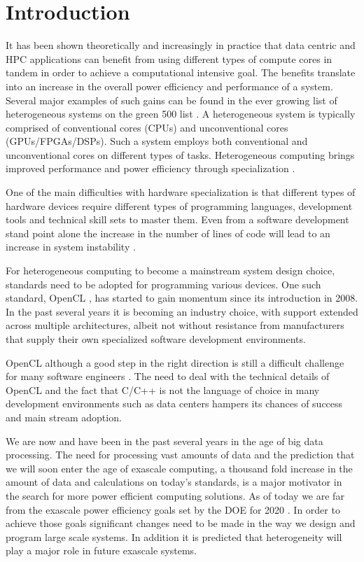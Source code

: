 \documentclass[runningheads,a4paper]{llncs}
\begin{document}
\section{Introduction}

It has been shown theoretically \cite{Chung:2010} and increasingly in practice that data centric \cite{Chalamalasetti:2012} and HPC \cite{Gan:2013} applications can benefit from using different types of compute cores in tandem in order to achieve a computational intensive goal. The benefits translate into an increase in the overall power efficiency and performance of a system. Several major examples of such gains can be found in the ever growing list of heterogeneous systems on the green 500 list \cite{green500:2014}. A heterogeneous system is typically comprised of conventional cores (CPUs) and unconventional cores (GPUs/FPGAs/DSPs). Such a system employs both conventional and unconventional cores on different types of tasks. Heterogeneous computing brings improved performance and power efficiency through specialization \cite{Huang:2009}.

One of the main difficulties with hardware specialization is that different types of hardware devices require different types of programming languages, development tools and technical skill sets to master them. Even from a software development stand point alone the increase in the number of lines of code will lead to an increase in system instability \cite{McConnell:1993}.

For heterogeneous computing to become a mainstream system design choice, standards need to be adopted for programming various devices. One such standard, OpenCL \cite{opencl:2011}, has started to gain momentum since its introduction in 2008. In the past several years it is becoming an industry choice, with support extended across multiple architectures, albeit not without resistance from manufacturers that supply their own specialized software development environments.

OpenCL although a good step in the right direction is still a difficult challenge for many software engineers \cite{tiode:2015}. The need to deal with the technical details of OpenCL and the fact that C/C++ is not the language of choice in many development environments such as data centers hampers its chances of success and main stream adoption.

We are now and have been in the past several years in the age of big data processing. The need for processing vast amounts of data and the prediction that we will soon enter the age of exascale computing, a thousand fold increase in the amount of data and calculations on today’s standards, is a major motivator in the search for more power efficient computing solutions. As of today we are far from the exascale power efficiency goals set by the DOE for 2020 \cite{Shalf:2010}. In order to achieve those goals significant changes need to be made in the way we design and program large scale systems. In addition it is predicted \cite{Dongarra:2011} that heterogeneity will play a major role in future exascale systems.
\end{document}
